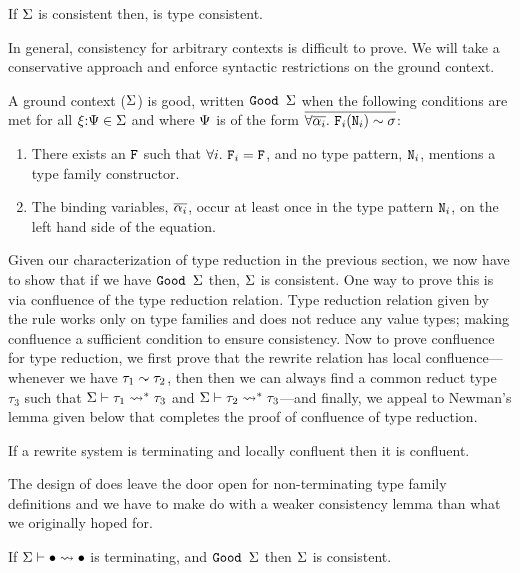 \documentclass[format=acmsmall,manuscript,screen,nonacm,margin=1in,11pt]{acmart}
\begin{document}
\begin{lemma}
  If $\Sigma$ is consistent then, \CLTF is type consistent.
\end{lemma}
In general, consistency for arbitrary contexts is difficult to prove.
We will take a conservative approach and enforce syntactic restrictions on the ground context.
\begin{defn}[$\Good\GEnv$]\label{def:good-ctx}
  A ground context ($\Sigma$) is good, written $\Good\GEnv$ when
  the following conditions are met for all $\xi{:}\Psi\in\Sigma$ and
  where $\Psi$ is of the form $\overline{\forall\overline{\alpha_i}.~\texttt{F}_i(\texttt{N}_i)\mathrel{\sim}\sigma}$:
  \begin{enumerate}
  \item There exists an $\texttt{F}$ such that  $\forall i.~\texttt{F}_i = \texttt{F}$,
    and no type pattern, $\texttt{N}_i$, mentions a type family constructor.
  \item The binding variables, $\overline{\alpha_i}$, occur at least once in the type pattern $\texttt{N}_i$,
    on the left hand side of the equation.
  \end{enumerate}
\end{defn}
Given our characterization of type reduction in the previous section, we now have to show
that if we have $\Good\GEnv$ then, $\Sigma$ is consistent. One way to prove this is
via confluence of the type reduction relation. Type reduction relation given by the rule 
works only on type families and does not reduce any value types; making 
confluence a sufficient condition to ensure consistency. Now to prove confluence for type reduction,
we first prove that the rewrite relation has local confluence---whenever we have ${\tau_1}\mathrel{\sim}{\tau_2}$, then 
then we can always find a common reduct type $\tau_3$ such that $\Sigma \vdash \tau_1 \rightsquigarrow^* \tau_3$ and
$\Sigma \vdash \tau_2 \rightsquigarrow^* \tau_3$---and finally, we appeal to Newman's lemma\cite{newman_theories_1942}
given below that completes the proof of confluence of type reduction.
\begin{lemma}[Newman]
  If a rewrite system is terminating and locally confluent then it is confluent.
\end{lemma}
The design of \CLTF does leave the door open for non-terminating type family definitions and 
we have to make do with a weaker consistency lemma than what we originally hoped for.
\begin{lemma}
  If $\Sigma \vdash \bullet \rightsquigarrow \bullet$ is terminating, and $\Good\GEnv$ then $\Sigma$ is consistent.
\end{lemma}
\end{document}
